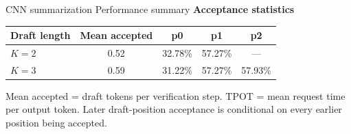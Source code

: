 \documentclass[aspectratio=169]{beamer}
\begin{document}
\begin{frame}{CNN summarization Performance summary}
  \vspace{0.08cm}
  \textbf{Acceptance statistics}

  \vspace{0.02cm}
  {\footnotesize
  \renewcommand{\arraystretch}{1.0}
  \begin{tabular}{lcccc}
    \hline
    \textbf{Draft length} & \textbf{Mean accepted} & \textbf{p0} & \textbf{p1} & \textbf{p2} \\
    \hline
    $K=2$ & 0.52 & 32.78\% & 57.27\% & --- \\
    $K=3$ & 0.59 & 31.22\% & 57.27\% & 57.93\% \\
    \hline
  \end{tabular}}

  \vspace{0.03cm}
  {\scriptsize Mean accepted = draft tokens per verification step. TPOT = mean
  request time per output token. Later draft-position acceptance is conditional
  on every earlier position being accepted.}
\end{frame}
\end{document}
